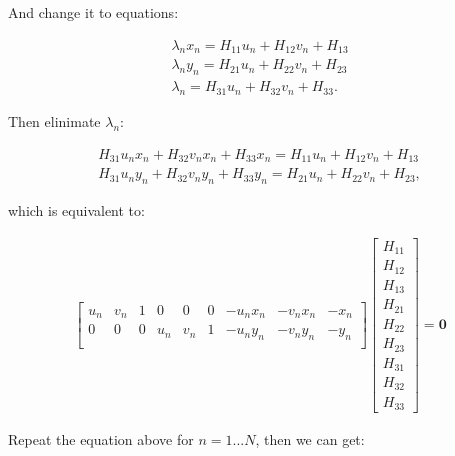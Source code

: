 \documentclass[11pt]{article}
\begin{document}
And change it to equations:

\begin{align}
    \lambda_n x_{n} = H_{11} u_{n} + H_{12} v_{n} + H_{13} \\
    \lambda_n y_{n} = H_{21} u_{n} + H_{22} v_{n} + H_{23} \\
    \lambda_n = H_{31} u_{n} + H_{32} v_{n} + H_{33} .
\end{align}

Then elinimate $\lambda_n$:

\begin{align}
    H_{31} u_{n} x_{n} + H_{32} v_{n} x_{n} + H_{33} x_{n} = H_{11} u_{n} + H_{12} v_{n} + H_{13} \\
    H_{31} u_{n} y_{n} + H_{32} v_{n} y_{n} + H_{33} y_{n} = H_{21} u_{n} + H_{22} v_{n} + H_{23},
\end{align}

which is equivalent to:

\begin{align}
    \begin{bmatrix}
        u_{n} & v_{n} & 1 & 0 & 0 & 0 & -u_{n} x_{n} & -v_{n} x_{n} & -x_{n} \\
        0 & 0 & 0 & u_{n} & v_{n} & 1 & -u_{n} y_{n} & -v_{n} y_{n} & -y_{n} \\
    \end{bmatrix}
    \begin{bmatrix}
        H_{11} \\ H_{12} \\ H_{13} \\
        H_{21} \\ H_{22} \\ H_{23} \\
        H_{31} \\ H_{32} \\ H_{33}
    \end{bmatrix}
    = \mathbf{0}
\end{align}

Repeat the equation above for $n=1...N$, then we can get:
\end{document}
